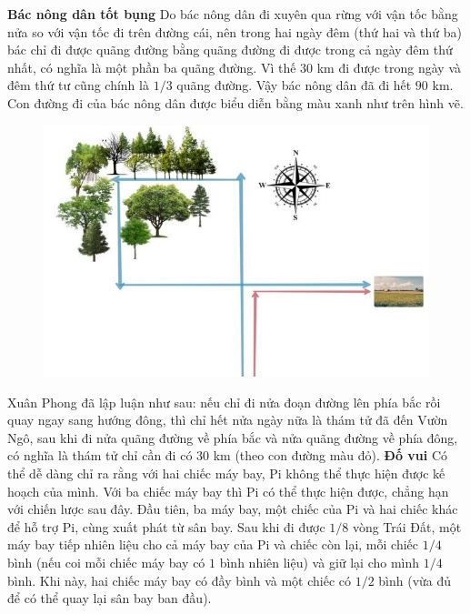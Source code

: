 \begin{multicols}{2}
	\textbf{\color{thachthuctoanhoc}Bác nông dân tốt bụng}
	\vskip 0.1cm
	Do bác nông dân đi xuyên qua rừng với vận tốc bằng nửa so với vận tốc đi trên đường cái, nên trong hai ngày đêm (thứ hai và thứ ba) bác chỉ đi được quãng đường bằng quãng đường đi được trong cả ngày đêm thứ nhất, có nghĩa là một phần ba quãng đường. Vì thế $30$ km đi được trong ngày và đêm thứ tư cũng chính là $1/3$ quãng đường. Vậy bác nông dân đã đi hết $90$ km. Con đường đi của bác nông dân được biểu diễn bằng màu xanh như trên hình vẽ. 
	\begin{figure}[H]
			\vspace*{-5pt}
			\centering
			\captionsetup{labelformat= empty, justification=centering}
			\includegraphics[width= 1\linewidth]{lgxp}
			\vspace*{-5pt}
		\end{figure}
	Xuân Phong đã lập luận như sau: nếu chỉ đi nửa đoạn đường lên phía bắc rồi quay ngay sang hướng đông, thì chỉ hết nửa ngày nữa là thám tử đã đến Vườn Ngô, sau khi đi nửa quãng đường về phía bắc và nửa quãng đường về phía đông, có nghĩa là thám tử chỉ cần đi có $30$ km (theo con đường màu đỏ). 
	\vskip 0.1cm
	\textbf{\color{thachthuctoanhoc}Đố vui}
	\vskip 0.1cm 
	Có thể dễ dàng chỉ ra rằng với hai chiếc máy bay, Pi không thể thực hiện được kế hoạch của mình. Với ba chiếc máy bay thì Pi có thể thực hiện được, chẳng hạn với chiến lược sau đây.   
	\vskip 0.1cm
	Đầu tiên, ba máy bay, một chiếc của Pi và hai chiếc khác để hỗ trợ Pi, cùng xuất phát từ sân bay. Sau khi đi được $1/8$ vòng Trái Đất, một máy bay tiếp nhiên liệu cho cả máy bay của Pi và chiếc còn lại, mỗi chiếc $1/4$ bình (nếu coi mỗi chiếc máy bay có $1$ bình nhiên liệu) và giữ lại cho mình $1/4$ bình. Khi này, hai chiếc máy bay có đầy bình và một chiếc có $1/2$ bình (vừa đủ để có thể quay lại sân bay ban đầu). 

\end{multicols}
